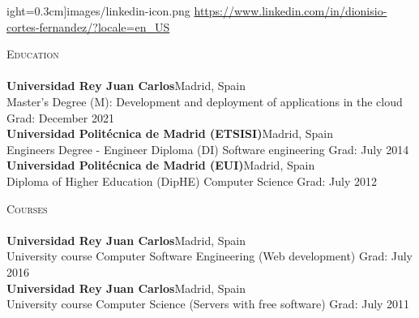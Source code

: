 \documentclass[a4paper]{article}
\newcommand{\lineunder} {
    \vspace*{-8pt} \\
    \hspace*{-18pt} \hrulefill \\
}
\newcommand{\header} [1] {
    {\hspace*{-18pt}\vspace*{6pt} \textsc{#1}}
    \vspace*{-6pt} \lineunder
}
\begin{document}
\begin{center}
ight=0.3cm]{images/linkedin-icon.png} \url{https://www.linkedin.com/in/dionisio-cortes-fernandez/?locale=en\_US}\\
\end{center}

\vspace*{2mm}

\header{Education}
\textbf{Universidad Rey Juan Carlos}\hfill Madrid, Spain\\
Master’s Degree (M): Development and deployment of applications in the cloud \hfill Grad: December 2021\\
\vspace{2mm}
\textbf{Universidad Polit\'ecnica de Madrid (ETSISI)}\hfill Madrid, Spain\\
Engineer\textquotesingle s Degree  - Engineer Diploma (DI) Software engineering \hfill Grad: July 2014\\
\vspace{2mm}
\textbf{Universidad Polit\'ecnica de Madrid (EUI)}\hfill Madrid, Spain\\
Diploma of Higher Education (DipHE) Computer Science \hfill Grad: July 2012\\
\vspace{2mm}
\vspace{2mm}

\header{Courses}
\textbf{Universidad Rey Juan Carlos}\hfill Madrid, Spain\\
University course Computer Software Engineering (Web development) \hfill Grad: July 2016\\
\vspace{2mm}
\textbf{Universidad Rey Juan Carlos}\hfill Madrid, Spain\\
University course Computer Science (Servers with free software) \hfill Grad: July 2011\\
\vspace*{2mm}
\end{document}
